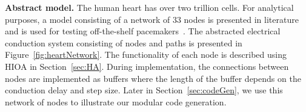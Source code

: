 \noindent \textbf{Abstract model.} The human heart has over two trillion
cells. For analytical purposes, a model consisting of a network of $33$
nodes is presented in literature and is used for testing off-the-shelf
pacemakers~\cite{chen14,zhihao12}. The abstracted electrical conduction
system consisting of nodes and paths is presented in
Figure~\ref{fig:heartNetwork}. The functionality of each node is
described using \acf{HIOA} in Section~\ref{sec:HA}.  During implementation, the 
connections between nodes are implemented as buffers where the length of the 
buffer depends on the conduction delay and step size.  Later in 
Section~\ref{sec:codeGen}, we use this network of nodes to illustrate our 
modular code generation.



